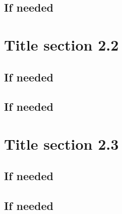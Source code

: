 \subsection{If needed}



\section{Title section 2.2}

\subsection{If needed}


\subsection{If needed}


\section{Title section 2.3}


\subsection{If needed}



\subsection{If needed}

